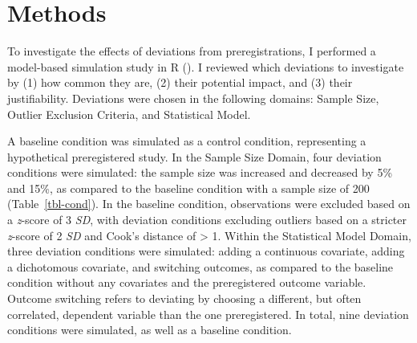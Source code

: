 \documentclass[
  man,
  floatsintext,
  longtable,
  nolmodern,
  notxfonts,
  notimes,
  colorlinks=true,linkcolor=blue,citecolor=blue,urlcolor=blue]{apa7}
\begin{document}
\section{Methods}\label{methods}

To investigate the effects of deviations from preregistrations, I
performed a model-based simulation study in R
(). I reviewed which
deviations to investigate by (1) how common they are, (2) their
potential impact, and (3) their justifiability. Deviations were chosen
in the following domains: Sample Size, Outlier Exclusion Criteria, and
Statistical Model.

A baseline condition was simulated as a control condition, representing
a hypothetical preregistered study. In the Sample Size Domain, four
deviation conditions were simulated: the sample size was increased and
decreased by 5\% and 15\%, as compared to the baseline condition with a
sample size of 200 (Table~\ref{tbl-cond}). In the baseline condition,
observations were excluded based on a \emph{z}-score of 3 \emph{SD},
with deviation conditions excluding outliers based on a stricter
\emph{z}-score of 2 \emph{SD} and Cook's distance of \textgreater{} 1.
Within the Statistical Model Domain, three deviation conditions were
simulated: adding a continuous covariate, adding a dichotomous
covariate, and switching outcomes, as compared to the baseline condition
without any covariates and the preregistered outcome variable. Outcome
switching refers to deviating by choosing a different, but often
correlated, dependent variable than the one preregistered. In total,
nine deviation conditions were simulated, as well as a baseline
condition.
\end{document}
